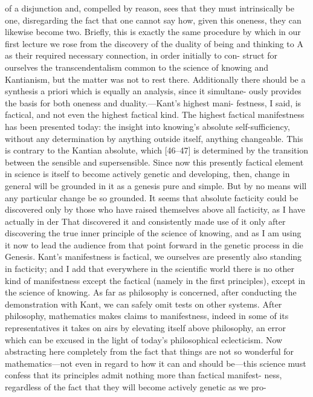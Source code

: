 of a disjunction and, compelled by reason, sees that they must intrinsically be
one, disregarding the fact that one cannot say how, given this oneness, they
can likewise become two. Briefly, this is exactly the same procedure by which
in our first lecture we rose from the discovery of the duality of being and
thinking to A as their required necessary connection, in order initially to con-
struct for ourselves the transcendentalism common to the science of knowing
and Kantianism, but the matter was not to rest there. Additionally there
should be a synthesis a priori which is equally an analysis, since it simultane-
ously provides the basis for both oneness and duality.—Kant’s highest mani-
festness, I said, is factical, and not even the highest factical kind. The highest
factical manifestness has been presented today: the insight into knowing’s
absolute self-sufficiency, without any determination by anything outside itself,
anything changeable. This is contrary to the Kantian absolute, which [46–47]
is determined by the transition between the sensible and supersensible. Since
now this presently factical element in science is itself to become actively
genetic and developing, then, change in general will be grounded in it as a
genesis pure and simple. But by no means will any particular change be so
grounded. It seems that absolute facticity could be discovered only by those
who have raised themselves above all facticity, as I have actually {in der That}
discovered it and consistently made use of it only after discovering the true
inner principle of the science of knowing, and as I am using it now to lead the
audience from that point forward in the genetic process {in die Genesis}.
Kant’s manifestness is factical, we ourselves are presently also standing
in facticity; and I add that everywhere in the scientific world there is no other
kind of manifestness except the factical (namely in the first principles), except
in the science of knowing. As far as philosophy is concerned, after conducting
the demonstration with Kant, we can safely omit tests on other systems. After
philosophy, mathematics makes claims to manifestness, indeed in some of its
representatives it takes on airs by elevating itself above philosophy, an error
which can be excused in the light of today’s philosophical eclecticism. Now
abstracting here completely from the fact that things are not so wonderful for
mathematics—not even in regard to how it can and should be—this science
must confess that its principles admit nothing more than factical manifest-
ness, regardless of the fact that they will become actively genetic as we pro-
